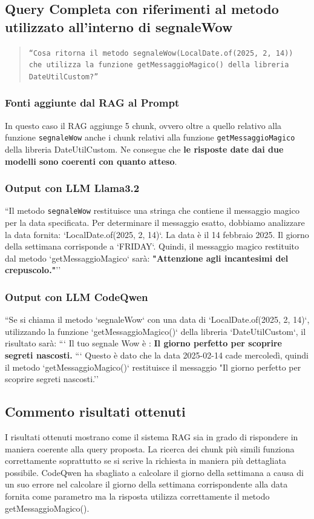 \documentclass[12pt,a4paper,openright,twoside]{book}
\begin{document}
\subsection{Query Completa con riferimenti al metodo utilizzato all'interno di segnaleWow}
\begin{quote}
    \texttt{``Cosa ritorna il metodo segnaleWow(LocalDate.of(2025, 2, 14)) che utilizza la funzione getMessaggioMagico() della libreria DateUtilCustom?''}
\end{quote}
\subsubsection{Fonti aggiunte dal RAG al Prompt}
In questo caso il RAG aggiunge 5 chunk, ovvero oltre a quello relativo alla funzione \texttt{segnaleWow} anche i chunk relativi alla funzione \texttt{getMessaggioMagico} della libreria DateUtilCustom.
Ne consegue che \textbf{le risposte date dai due modelli sono coerenti con quanto atteso}.
\subsubsection{Output con LLM Llama3.2}
``Il metodo \texttt{segnaleWow} restituisce una stringa che contiene il messaggio magico per la data specificata. 
Per determinare il messaggio esatto, dobbiamo analizzare la data fornita: `LocalDate.of(2025, 2, 14)`.
La data è il 14 febbraio 2025. Il giorno della settimana corrisponde a `FRIDAY`.
Quindi, il messaggio magico restituito dal metodo `getMessaggioMagico` sarà:
\textbf{"Attenzione agli incantesimi del crepuscolo."}''
\subsubsection{Output con LLM CodeQwen}
``Se si chiama il metodo `segnaleWow` con una data di `LocalDate.of(2025, 2, 14)`, utilizzando la funzione `getMessaggioMagico()` della libreria `DateUtilCustom`, il risultato sarà:
```
Il tuo segnale Wow è : \textbf{Il giorno perfetto per scoprire segreti nascosti.}
```
Questo è dato che la data 2025-02-14 cade mercoledì, quindi il metodo `getMessaggioMagico()` restituisce il messaggio "Il giorno perfetto per scoprire segreti nascosti.''
\subsection{Commento risultati ottenuti}
I risultati ottenuti mostrano come il sistema RAG sia in grado di rispondere in maniera coerente alla query proposta.
La ricerca dei chunk più simili funziona correttamente soprattutto se si scrive la richiesta in maniera più dettagliata possibile.
CodeQwen ha sbagliato a calcolare il giorno della settimana a causa di un suo errore nel calcolare il giorno della settimana corrispondente alla data fornita come parametro ma la risposta utilizza correttamente il metodo getMessaggioMagico().
\end{document}
